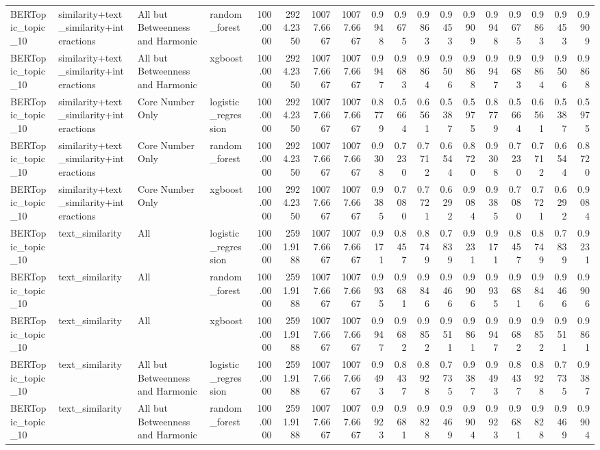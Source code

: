 \begin{tabular}{llllrrrrrrrrrrrrrr}
BERTopic_topic_10 & similarity+text_similarity+interactions & All but Betweenness and Harmonic & random_forest & 100.0000 & 2924.2350 & 10077.6667 & 10077.6667 & 0.9948 & 0.9675 & 0.9863 & 0.9453 & 0.9909 & 0.9948 & 0.9675 & 0.9863 & 0.9453 & 0.9909 \\
BERTopic_topic_10 & similarity+text_similarity+interactions & All but Betweenness and Harmonic & xgboost & 100.0000 & 2924.2350 & 10077.6667 & 10077.6667 & 0.9947 & 0.9683 & 0.9864 & 0.9506 & 0.9868 & 0.9947 & 0.9683 & 0.9864 & 0.9506 & 0.9868 \\
BERTopic_topic_10 & similarity+text_similarity+interactions & Core Number Only & logistic_regression & 100.0000 & 2924.2350 & 10077.6667 & 10077.6667 & 0.8779 & 0.5664 & 0.6561 & 0.5387 & 0.5975 & 0.8779 & 0.5664 & 0.6561 & 0.5387 & 0.5975 \\
BERTopic_topic_10 & similarity+text_similarity+interactions & Core Number Only & random_forest & 100.0000 & 2924.2350 & 10077.6667 & 10077.6667 & 0.9308 & 0.7230 & 0.7712 & 0.6544 & 0.8720 & 0.9308 & 0.7230 & 0.7712 & 0.6544 & 0.8720 \\
BERTopic_topic_10 & similarity+text_similarity+interactions & Core Number Only & xgboost & 100.0000 & 2924.2350 & 10077.6667 & 10077.6667 & 0.9385 & 0.7080 & 0.7721 & 0.6292 & 0.9084 & 0.9385 & 0.7080 & 0.7721 & 0.6292 & 0.9084 \\
BERTopic_topic_10 & text_similarity & All & logistic_regression & 100.0000 & 2591.9188 & 10077.6667 & 10077.6667 & 0.9171 & 0.8457 & 0.8749 & 0.7839 & 0.9231 & 0.9171 & 0.8457 & 0.8749 & 0.7839 & 0.9231 \\
BERTopic_topic_10 & text_similarity & All & random_forest & 100.0000 & 2591.9188 & 10077.6667 & 10077.6667 & 0.9935 & 0.9681 & 0.9846 & 0.9466 & 0.9906 & 0.9935 & 0.9681 & 0.9846 & 0.9466 & 0.9906 \\
BERTopic_topic_10 & text_similarity & All & xgboost & 100.0000 & 2591.9188 & 10077.6667 & 10077.6667 & 0.9947 & 0.9682 & 0.9852 & 0.9511 & 0.9861 & 0.9947 & 0.9682 & 0.9852 & 0.9511 & 0.9861 \\
BERTopic_topic_10 & text_similarity & All but Betweenness and Harmonic & logistic_regression & 100.0000 & 2591.9188 & 10077.6667 & 10077.6667 & 0.9493 & 0.8437 & 0.8928 & 0.7735 & 0.9387 & 0.9493 & 0.8437 & 0.8928 & 0.7735 & 0.9387 \\
BERTopic_topic_10 & text_similarity & All but Betweenness and Harmonic & random_forest & 100.0000 & 2591.9188 & 10077.6667 & 10077.6667 & 0.9923 & 0.9681 & 0.9828 & 0.9469 & 0.9904 & 0.9923 & 0.9681 & 0.9828 & 0.9469 & 0.9904 \\

\end{tabular}
